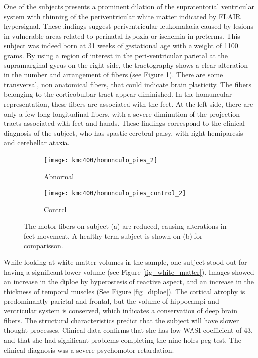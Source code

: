 One of the subjects presents a prominent dilation of the supratentorial ventricular system with thinning of the periventricular white matter indicated by FLAIR hypersignal. These findings suggest periventricular leukomalacia caused by lesions in vulnerable areas related to perinatal hypoxia or ischemia in preterms. This subject was indeed born at 31 weeks of gestational age with a weight of 1100 grams. By using a region of interest in the peri-ventricular parietal at the supramarginal gyrus on the right side, the tractography shows a clear alteration in the number and arrangement of fibers (see Figure \ref{fig_homunculus_feet}). There are some transversal, non anatomical fibers, that could indicate brain plasticity. The fibers belonging to the corticobulbar tract appear diminished. In the homuncular representation, these fibers are associated with the feet. At the left side, there are only a few long longitudinal fibers, with a severe diminution of the projection tracts associated with feet and hands. These findings correspond to the clinical diagnosis of the subject, who has spastic cerebral palsy, with right hemiparesis and cerebellar ataxia.  

\begin{figure}
	\centering
	\begin{subfigure}{0.45\textwidth}
		\texttt{[image: kmc400/homunculo\_pies\_2]}
		\caption{Abnormal}
	\end{subfigure}
	\begin{subfigure}{0.45\textwidth}
		\texttt{[image: kmc400/homunculo\_pies\_control\_2]}
		\caption{Control}
	\end{subfigure}
	\caption{The motor fibers on subject (a) are reduced, causing alterations in feet movement. A healthy term subject is shown on (b) for comparisson. }
	\label{fig_homunculus_feet}
\end{figure}

While looking at white matter volumes in the sample, one subject stood out for having a significant lower volume (see Figure \ref{fig_white_matter}). Images showed an increase  in the diploe by hyperostesis of reactive aspect, and an increase in the thickness of temporal muscles (See Figure \ref{fig_diploe}). The cortical atrophy is predominantly parietal and frontal, but the volume of hippocampi and ventricular system is conserved, which indicates a conservation of deep brain fibers. The structural characteristics predict that the subject will have slower thought processes. Clinical data confirms that she has low WASI coefficient of 43, and that she had significant problems completing the nine holes peg test. The clinical diagnosis was a severe psychomotor retardation.


